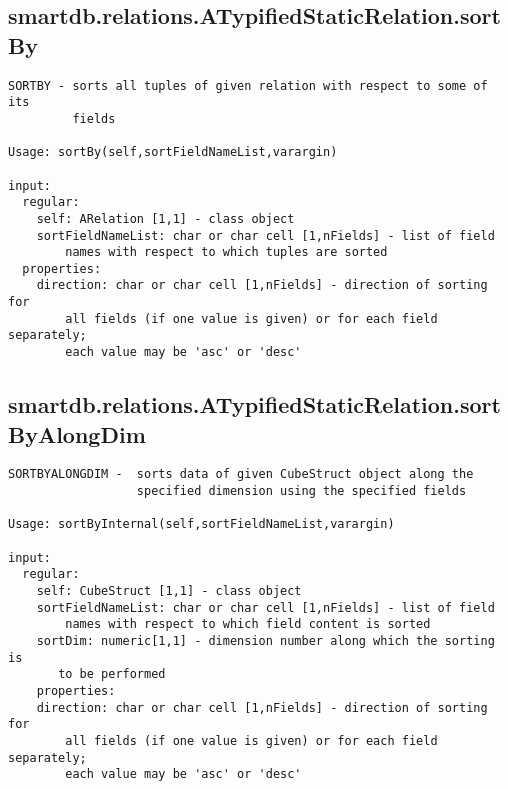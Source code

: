 \subsection{\texorpdfstring{smartdb.relations.ATypifiedStaticRelation.sortBy}{sortBy}}\label{method:smartdb.relations.ATypifiedStaticRelation.sortBy}
\begin{verbatim}
SORTBY - sorts all tuples of given relation with respect to some of its
         fields

Usage: sortBy(self,sortFieldNameList,varargin)

input:
  regular:
    self: ARelation [1,1] - class object
    sortFieldNameList: char or char cell [1,nFields] - list of field
        names with respect to which tuples are sorted
  properties:
    direction: char or char cell [1,nFields] - direction of sorting for
        all fields (if one value is given) or for each field separately;
        each value may be 'asc' or 'desc'
\end{verbatim}
\subsection{\texorpdfstring{smartdb.relations.ATypifiedStaticRelation.sortByAlongDim}{sortByAlongDim}}\label{method:smartdb.relations.ATypifiedStaticRelation.sortByAlongDim}
\begin{verbatim}
SORTBYALONGDIM -  sorts data of given CubeStruct object along the
                  specified dimension using the specified fields

Usage: sortByInternal(self,sortFieldNameList,varargin)

input:
  regular:
    self: CubeStruct [1,1] - class object
    sortFieldNameList: char or char cell [1,nFields] - list of field
        names with respect to which field content is sorted
    sortDim: numeric[1,1] - dimension number along which the sorting is
       to be performed
    properties:
    direction: char or char cell [1,nFields] - direction of sorting for
        all fields (if one value is given) or for each field separately;
        each value may be 'asc' or 'desc'
\end{verbatim}
